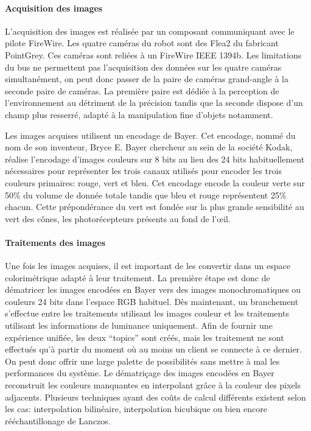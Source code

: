 \paragraph{Acquisition des images}

L'acquisition des images est réalisée par un composant communiquant
avec le pilote FireWire. Les quatre caméras du robot sont des Flea2 du
fabricant PointGrey. Ces caméras sont reliées à un FireWire IEEE
1394b. Les limitations du bus ne permettent
pas l'acquisition des données sur les quatre caméras simultanément, on
peut donc passer de la paire de caméras grand-angle à la seconde paire
de caméras. La première paire est dédiée à la perception de
l'environnement au détriment de la précision tandis que la seconde
dispose d'un champ plus resserré, adapté à la manipulation fine
d'objets notamment.

Les images acquises utilisent un encodage de Bayer. Cet encodage, nommé du nom de son inventeur, Bryce
E. Bayer chercheur au sein de la société Kodak, réalise l'encodage
d'images couleurs sur 8 bits au lieu des 24 bits habituellement
nécessaires pour représenter les trois canaux utilisés pour encoder
les trois couleurs primaires: rouge, vert et bleu. Cet encodage encode
la couleur verte sur 50\% du volume de donnée totale tandis que bleu
et rouge représentent 25\% chacun. Cette prépondérance du vert est
fondée sur la plus grande sensibilité au vert des cônes, les
photorécepteurs présents au fond de l'\oe il.


\paragraph{Traitements des images}

Une fois les images acquises, il est important de les convertir dans
un espace colorimétrique adapté à leur
traitement. La première étape est donc de dématricer les images
encodées en Bayer vers des images monochromatiques ou couleurs 24 bits
dans l'espace RGB habituel. Dès maintenant, un branchement s'effectue
entre les traitements utilisant les images couleur et les traitements
utilisant les informations de luminance uniquement. Afin de fournir
une expérience unifiée, les deux ``topics'' sont créés, mais les
traitement ne sont effectués qu'à partir du moment où au moins un
client se connecte à ce dernier. On peut donc offrir une large palette
de possibilités sans mettre à mal les performances du système. Le
dématriçage des images encodées en Bayer
reconstruit les couleurs manquantes en interpolant grâce à la couleur
des pixels adjacents. Plusieurs techniques ayant des coûts de calcul
différents existent selon les cas: interpolation bilinéaire,
interpolation bicubique ou bien encore rééchantillonage de
Lanczos.


